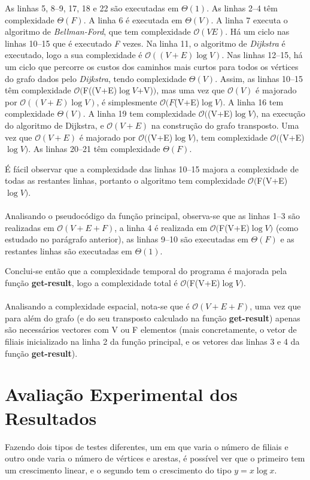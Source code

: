 \documentclass[12pt,a4paper,notitlepage]{article}
\renewcommand{\O}[1]{$\mathcal{O}(#1)$}
\begin{document}
As linhas 5, 8--9, 17, 18 e 22 são executadas em $\Theta(1)$.
As linhas 2--4 têm complexidade $\Theta(F)$.
A linha 6 é executada em $\Theta(V)$.
A linha 7 executa o algoritmo de \emph{Bellman-Ford}, que tem complexidade \O{VE}.
Há um ciclo nas linhas 10--15 que é executado \emph{F} vezes.
Na linha 11, o algoritmo de \emph{Dijkstra} é executado, logo a sua complexidade é \O{(V+E)\log{V}}.
Nas linhas 12--15, há um ciclo que percorre os custos dos caminhos mais curtos para todos os vértices do grafo dados pelo \emph{Dijkstra}, tendo complexidade $\Theta(V)$.
Assim, as linhas 10--15 têm complexidade \O{$F((V+E)$\log{V}$+V)$}, mas uma vez que \O{V} é majorado por \O{(V+E)\log{V}}, é simplesmente \O{F$(V+E)$\log{V}}.
A linha 16 tem complexidade $\Theta(V)$.
A linha 19 tem complexidade \O{$(V+E)$\log{V}}, na execução do algoritmo de Dijkstra, e \O{V+E} na construção do grafo transposto. Uma vez que \O{V+E} é majorado por \O{$(V+E)$\log{V}}, tem complexidade \O{$(V+E)$\log{V}}.
As linhas 20--21 têm complexidade $\Theta(F)$.

É fácil observar que a complexidade das linhas 10--15 majora a complexidade de todas as restantes linhas, portanto o algoritmo tem complexidade \O{$F(V+E)$\log{V}}.
\\
\\
Analisando o pseudocódigo da função principal, observa-se que as linhas 1--3 são realizadas em \O{V+E+F}, a linha 4 é realizada em \O{$F(V+E)$\log{V}} (como estudado no parágrafo anterior), as linhas 9--10 são executadas em $\Theta(F)$ e as restantes linhas são executadas em $\Theta(1)$.

Conclui-se então que a complexidade temporal do programa é majorada pela função \textbf{get-result}, logo a complexidade total é \O{$F(V+E)$\log{V}}.
\\
\\
Analisando a complexidade espacial, nota-se que é \O{V+E+F}, uma vez que para além do grafo (e do seu transposto calculado na função \textbf{get-result}) apenas são necessários vectores com V ou F elementos (mais concretamente, o vetor de filiais inicializado na linha 2 da função principal, e os vetores das linhas 3 e 4 da função \textbf{get-result}).

\section{Avaliação Experimental dos Resultados}

Fazendo dois tipos de testes diferentes, um em que varia o número de filiais e outro onde varia o número de vértices e arestas, é possível ver que o primeiro tem um crescimento linear, e o segundo tem o crescimento do tipo $y = x\log{x}$.
\end{document}
